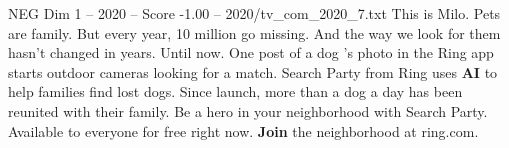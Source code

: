 \begin{textsample}{NEG Dim 1 – 2020 – Score -1.00 – 2020/tv\_com\_2020\_7.txt}  \label{ex:f1_neg_007}
This is Milo.
Pets are family.
But every year, 10 million go missing.
And the way we look for them hasn't changed in years.
Until now.
One post of a dog 's photo in the Ring app starts outdoor cameras looking for a match.
Search Party from Ring uses \textbf{AI} to help families find lost dogs.
Since launch, more than a dog a day has been reunited with their family.
Be a hero in your neighborhood with Search Party.
Available to everyone for free right now. \textbf{Join} the neighborhood at ring.com.

\end{textsample}
